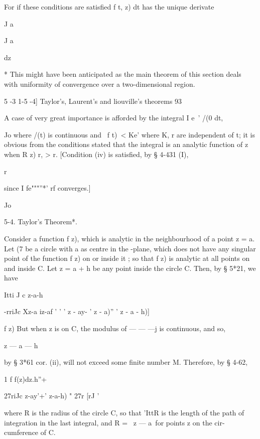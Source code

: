 {{For if these conditions are satisfied f t, z) dt has the unique derivate 

J a 



J a 



dz 



* This might have been anticipated as the main theorem of this section deals with uniformity 
of convergence over a two-dimensional region. 



5 -3 1-5 -4] Taylor's, Laurent's and liouville's theorems 93 

A case of very great importance is afforded by the integral I e~' /(0 dt, 

Jo 
where /(t) is continuous and \ f t)\ < Ke'  where K, r are independent of t; 
it is obvious from the conditions stated that the integral is an analytic 
function of z when R  z)   r, > r. [Condition (iv) is satisfied, by § 4-431 (I), 

r 

since I fe"""''*' rf  converges.] 

Jo 

5-4. Taylor's Theorem*. 

Consider a function f z), which is analytic in the neighbourhood of a 
point z = a. Let (7 be a circle with a as centre in the   -plane, which does 
not have any singular point of the function f z) on or inside it ; so that f z) 
is analytic at all points on and inside C. Let z = a + h be any point inside 
the circle C. Then, by § 5*21, we have 

    Itti J c z-a-h 

 -rriJc   Xz-a iz-af  ' ' '    z - ay- '    z - a)'' '  z - a - h)] 

f z) 
But when z is on C, the modulus of —  — —j is continuous, and so, 

z — a — h 

by § 3*61 cor. (ii), will not exceed some finite number M. 
Therefore, by § 4-62, 



1 f f(z)dz.h''+  



27riJc z-ay'+' z-a-h) "  27r [rJ ' 

where R is the radius of the circle C, so that 'IttR is the length of the path 
of integration in the last integral, and R = \ z — a\ for points z on the cir- 
cumference of C. 

}}
